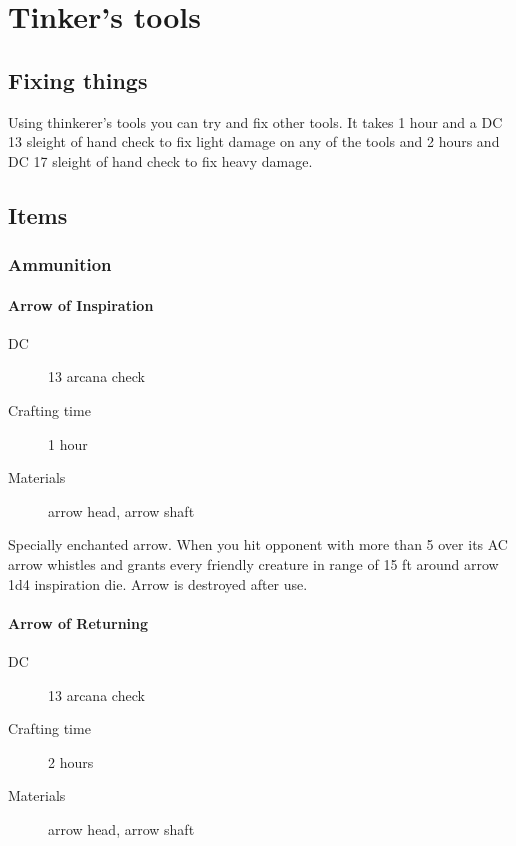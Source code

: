 \chapter{Tinker's tools}

\section{Fixing things}

Using thinkerer's tools you can try and fix other tools. It takes 1 hour and a DC 13 sleight of hand check to fix light damage on any of the tools and 2 hours and DC 17 sleight of hand check to fix heavy damage.

\section{Items}

\subsection{Ammunition}

\subsubsection{Arrow of Inspiration}

\begin{description}
\item [DC] 13 arcana check
\item [Crafting time] 1 hour
\item [Materials] arrow head, arrow shaft
\end{description}

Specially enchanted arrow. When you hit opponent with more than 5 over its AC arrow whistles and grants every friendly creature in range of 15 ft around arrow 1d4 inspiration die. Arrow is destroyed after use.

\subsubsection{Arrow of Returning}

\begin{description}
\item [DC] 13 arcana check
\item [Crafting time] 2 hours
\item [Materials] arrow head, arrow shaft
\end{description}

